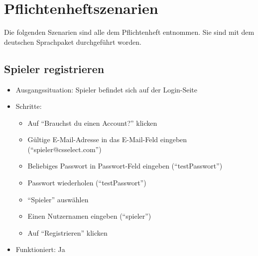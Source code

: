 \documentclass[a4paper]{scrreprt}
\begin{document}
        \section{Pflichtenheftszenarien}
        Die folgenden Szenarien sind alle dem Pflichtenheft entnommen. Sie sind mit dem deutschen Sprachpaket durchgeführt worden.

            \subsection{Spieler registrieren}
            \begin{itemize}
                \item Ausgangssituation: Spieler befindet sich auf der Login-Seite
                \item Schritte:
                    \begin{itemize}
                        \item Auf \enquote{Brauchst du einen Account?} klicken
                        \item Gültige E-Mail-Adresse in das E-Mail-Feld eingeben (\enquote{spieler@csselect.com})
                        \item Beliebiges Passwort in Passwort-Feld eingeben (\enquote{testPasswort})
                        \item Passwort wiederholen (\enquote{testPasswort})
                        \item \enquote{Spieler} auswählen
                        \item Einen Nutzernamen eingeben (\enquote{spieler})
                        \item Auf \enquote{Registrieren} klicken
                    \end{itemize}
                \item Funktioniert: Ja
            \end{itemize}
\end{document}
